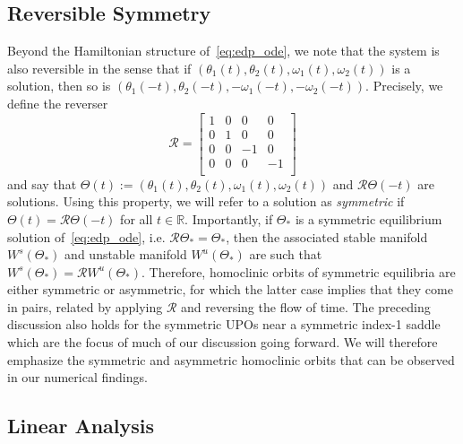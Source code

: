 \documentclass[11pt]{article}
\numberwithin{equation}{section}
\theoremstyle{plain}
\begin{document}

\subsection{Reversible Symmetry}\label{sec:Symmetry}

Beyond the Hamiltonian structure of~\eqref{eq:edp_ode}, we note that the system is also reversible in the sense that if $(\theta_1(t),\theta_2(t),\omega_1(t),\omega_2(t))$ is a solution, then so is $(\theta_1(-t),\theta_2(-t),-\omega_1(-t),-\omega_2(-t))$. Precisely, we define the reverser 
\begin{equation}\label{Reverser}
	\mathcal{R} = \begin{bmatrix}
		1 & 0 & 0 & 0 \\ 0 & 1 & 0 & 0 \\ 0 & 0 & -1 & 0 \\ 0 & 0 & 0 & -1 \\
	\end{bmatrix}
\end{equation} 
and say that $\Theta(t) := (\theta_1(t),\theta_2(t),\omega_1(t),\omega_2(t))$ and $\mathcal{R}\Theta(-t)$ are solutions. Using this property, we will refer to a solution as {\em symmetric} if $\Theta(t) = \mathcal{R}\Theta(-t)$ for all $t \in \mathbb{R}$. Importantly, if $\Theta_*$ is a symmetric equilibrium solution of~\eqref{eq:edp_ode}, i.e. $\mathcal{R}\Theta_* = \Theta_*$, then the associated stable manifold $W^s(\Theta_*)$ and unstable manifold $W^u(\Theta_*)$ are such that $W^s(\Theta_*) = \mathcal{R}W^u(\Theta_*)$. Therefore, homoclinic orbits of symmetric equilibria are either symmetric or asymmetric, for which the latter case implies that they come in pairs, related by applying $\mathcal{R}$ and reversing the flow of time. The preceding discussion also holds for the symmetric UPOs near a symmetric index-1 saddle which are the focus of much of our discussion going forward. We will therefore emphasize the symmetric and asymmetric homoclinic orbits that can be observed in our numerical findings. 




\subsection{Linear Analysis}\label{sec:linearanalysis}
\end{document}
